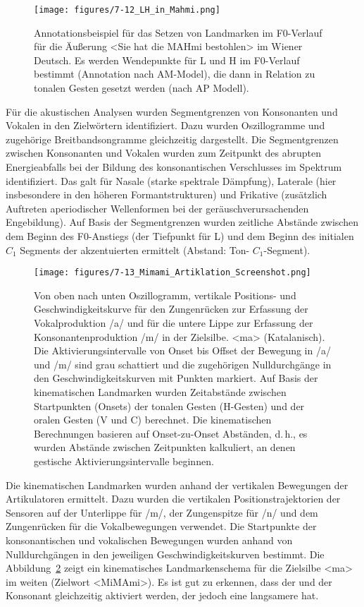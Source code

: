 \begin{figure}
	\texttt{[image: figures/7-12\_LH\_in\_Mahmi.png]}
	\caption{Annotationsbeispiel für das Setzen von Landmarken im F0-Verlauf für die Äußerung <Sie hat die MAHmi bestohlen> im Wiener Deutsch. Es werden Wendepunkte für L und H im F0-Verlauf bestimmt (Annotation nach AM-Model), die dann in Relation zu tonalen Gesten gesetzt werden (nach AP Modell).}
	\label{figure:0712}
\end{figure}
 
\newpage  
Für die akustischen Analysen wurden Segmentgrenzen von Konsonanten und Vokalen in den Zielwörtern identifiziert. Dazu wurden Oszillogramme und zugehörige Breitbandsongramme gleichzeitig dargestellt. Die Segmentgrenzen zwischen Konsonanten und Vokalen wurden zum Zeitpunkt des abrupten Energieabfalls bei der Bildung des konsonantischen Verschlusses im Spektrum identifiziert. Das galt für Nasale (starke spektrale Dämpfung), Laterale (hier insbesondere in den höheren Formantstrukturen) und Frikative (zusätzlich Auftreten aperiodischer Wellenformen bei der geräuschverursachenden Engebildung). Auf Basis der Segmentgrenzen wurden zeitliche Abstände zwischen dem Beginn des F0-Anstiegs (der Tiefpunkt für L) und dem Beginn des initialen ${C}_{1}$ Segments der akzentuierten  ermittelt (Abstand: Ton- ${C}_{1}${}-Segment).

\begin{figure}[t]
	\texttt{[image: figures/7-13\_Mimami\_Artiklation\_Screenshot.png]}
	\caption{Von oben nach unten Oszillogramm, vertikale Positions- und Geschwindigkeitskurve für den Zungenrücken zur Erfassung der Vokalproduktion /a/ und für die untere Lippe zur Erfassung der Konsonantenproduktion /m/ in der Zielsilbe. <ma> (Katalanisch). Die Aktivierungsintervalle von Onset bis Offset der Bewegung in /a/ und /m/ sind grau schattiert und die zugehörigen Nulldurchgänge in den Geschwindigkeitskurven mit Punkten markiert. Auf Basis der kinematischen Landmarken wurden Zeitabstände zwischen Startpunkten (Onsets) der tonalen Gesten (H-Gesten) und der oralen Gesten (V und C) berechnet. Die kinematischen Berechnungen basieren auf Onset-zu-Onset Abständen, d.\,h., es wurden Abstände zwischen Zeitpunkten kalkuliert, an denen gestische Aktivierungsintervalle beginnen.}
	\label{figure:0713}
\end{figure}

Die kinematischen Landmarken wurden anhand der vertikalen Bewegungen der Artikulatoren ermittelt. Dazu wurden die vertikalen Positionstrajektorien der Sensoren auf der Unterlippe für /m/, der Zungenspitze für /n/ und dem Zungenrücken für die Vokalbewegungen verwendet. Die Startpunkte der konsonantischen und vokalischen Bewegungen wurden anhand von Nulldurchgängen in den jeweiligen Geschwindigkeitskurven bestimmt. Die Abbildung~\ref{figure:0713} zeigt ein kinematisches Landmarkenschema für die Zielsilbe <ma> im weiten  (Zielwort <MiMAmi>). Es ist gut zu erkennen, dass der  und der Konsonant gleichzeitig aktiviert werden, der  jedoch eine langsamere  hat.


